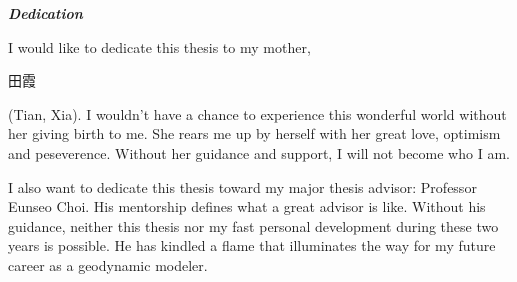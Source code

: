 \begin{center}
\textbf{\textit{Dedication}}
\end{center}

I would like to dedicate this thesis to my mother, \begin{CJK}{UTF8}{gbsn}田霞\end{CJK} (Tian, Xia). I wouldn't have a chance to experience this wonderful world without her giving birth to me. She rears me up by herself with her great love, optimism and peseverence. Without her guidance and support, I will not become who I am.

I also want to dedicate this thesis toward my major thesis advisor: Professor Eunseo Choi. His mentorship defines what a great advisor is like. Without his guidance, neither this thesis nor my fast personal development during these two years is possible. He has kindled a flame that illuminates the way for my future career as a geodynamic modeler.   

